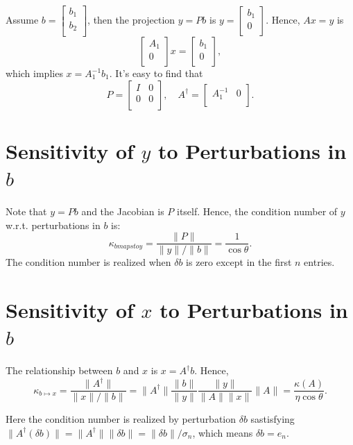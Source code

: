 Assume $b = \begin{bmatrix}
     b_1 \\
     b_2 \\
\end{bmatrix}$, then the projection $y=Pb$ is  $y = \begin{bmatrix}
         b_1 \\
         0 \\
    \end{bmatrix}.$   
Hence, $Ax=y$ is 
\[
    \begin{bmatrix}
         A_1 \\
         0 \\
    \end{bmatrix} x = \begin{bmatrix}
         b_1 \\
         0 \\
    \end{bmatrix},  
\]
which implies $   x = A_1^{-1} b_1. $
It's easy to find that 
\[
    P = \begin{bmatrix}
        I &  0 \\
        0 &  0 \\
    \end{bmatrix}, \quad A^\dagger = \begin{bmatrix}
        A_1^{-1}  &  0 \\
    \end{bmatrix}.   
\]

\section{Sensitivity of $y$ to Perturbations in $b$}  
Note that $y= Pb$ and the Jacobian is $P$ itself. Hence, the condition number of $y$ w.r.t. perturbations in $b$ is: 
\[
    \kappa_{b mapsto y} = \frac{\|P\|}{\|y\|/ \|b\|} = \frac{1}{\cos \theta}. 
\]
 The condition number is realized when $\delta b$ is zero except in the first $n$ entries. 

 \section{Sensitivity of $x$ to Perturbations in $b$} 
 The relationship between $b$ and $x$ is $x= A^\dagger b$. Hence, 
 \[
    \kappa_{b\mapsto x} = \frac{\|A^\dagger\|}{\|x\|/ \|b\|} = \|A^\dagger\| \frac{\|b\|}{\|y\|}\frac{\|y\|}{\|A\| \|x\|}\|A\| = \frac{\kappa(A)}{\eta  \cos \theta }. 
 \]

 Here the condition number is realized by perturbation $\delta  b$ sastisfying $ \|A^\dagger (\delta  b)\| = \|A^\dagger\| \|\delta  b\| = \|\delta  b \|/ \sigma _n$, which means $\delta b= e_n$. 


